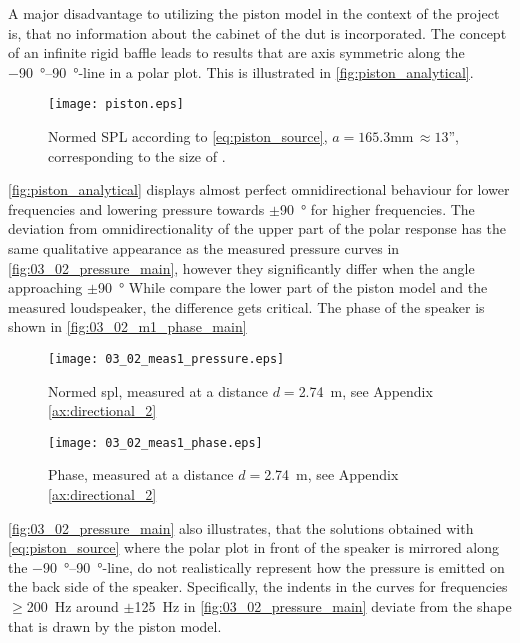 A major disadvantage to utilizing the piston model in the context of the project is, that no information about the cabinet of the \gls{dut} is incorporated. The concept of an infinite rigid baffle leads to results that are axis symmetric along the \SIrange{-90}{90}{\degree}-line in a polar plot. This is illustrated in \autoref{fig:piston_analytical}.
\begin{figure}[H]
	\centering
	\texttt{[image: piston.eps]}
	\caption{Normed SPL according to \autoref{eq:piston_source}, $a=165.3$\si{\milli\meter}$\,\approx 13$'', corresponding to the size of \citep{seas33}.}
		\label{fig:piston_analytical}
\end{figure}
\autoref{fig:piston_analytical} displays almost perfect omnidirectional behaviour for lower frequencies and lowering pressure towards $\pm$\SI{90}{\degree} for higher frequencies. The deviation from omnidirectionality of the upper part of the polar response has the same qualitative appearance as the measured pressure curves in \autoref{fig:03_02_pressure_main}, however they significantly differ when the angle approaching $\pm$\SI{90}{\degree} While compare the lower part of the piston model and the measured loudspeaker, the difference gets critical. The phase of the speaker is shown in  \autoref{fig:03_02_m1_phase_main}  
\begin{figure}[H]
	\centering
	\texttt{[image: 03\_02\_meas1\_pressure.eps]}
	\caption{Normed \gls{spl}, measured at a distance \(d=\)\SI{2.74}{\meter}, see Appendix \ref{ax:directional_2}}
		\label{fig:03_02_pressure_main}
\end{figure}

\begin{figure}[H]
	\centering
	\texttt{[image: 03\_02\_meas1\_phase.eps]}
	\caption{Phase, measured at a distance \(d=\)\SI{2.74}{\meter}, see Appendix \ref{ax:directional_2}}
		\label{fig:03_02_m1_phase_main}
\end{figure}

\autoref{fig:03_02_pressure_main} also illustrates, that the solutions obtained with \autoref{eq:piston_source} where the polar plot in front of the speaker is mirrored along the \SIrange{-90}{90}{\degree}-line, do not realistically represent how the pressure is emitted on the back side of the speaker. Specifically, the indents in the curves for frequencies $\ge$\SI{200}{\hertz} around $\pm$\SI{125}{\hertz} in \autoref{fig:03_02_pressure_main} deviate from the shape that is drawn by the piston model. 


